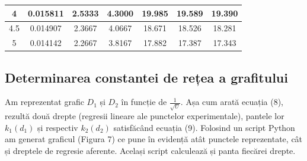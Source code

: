 \documentclass{article}
\begin{document}
\begin{table}[H]
\begin{tabular}{|c|c|c|c|c|c|c|}
    {\color[HTML]{000000} 4}     & {\color[HTML]{000000} 0.015811}                                                         & {\color[HTML]{000000} 2.5333}                                                   & {\color[HTML]{000000} 4.3000}                                                   & {\color[HTML]{000000} 19.985}                                                                   & {\color[HTML]{000000} 19.589}                                                                   & {\color[HTML]{000000} 19.390}                                                         \\ \hline
    {\color[HTML]{000000} 4.5}   & {\color[HTML]{000000} 0.014907}                                                         & {\color[HTML]{000000} 2.3667}                                                   & {\color[HTML]{000000} 4.0667}                                                   & {\color[HTML]{000000} 18.671}                                                                   & {\color[HTML]{000000} 18.526}                                                                   & {\color[HTML]{000000} 18.281}                                                         \\ \hline
    {\color[HTML]{000000} 5}     & {\color[HTML]{000000} 0.014142}                                                         & {\color[HTML]{000000} 2.2667}                                                   & {\color[HTML]{000000} 3.8167}                                                   & {\color[HTML]{000000} 17.882}                                                                   & {\color[HTML]{000000} 17.387}                                                                   & {\color[HTML]{000000} 17.343}                                                         \\ \hline
    \end{tabular}
    \end{table}

\subsection{Determinarea constantei de rețea a grafitului}

\makebox[1cm]{} Am reprezentat grafic ${D}{_1}$ și ${D}{_2}$ în funcție de $\frac{1}{\sqrt{U}}$.
Așa cum arată ecuația (8), rezultă două drepte (regresii lineare ale punctelor experimentale), pantele lor ${k}{_1}({d}{_1})$
și respectiv ${k}{_2}({d}{_2})$ satisfăcând ecuația (9). Folosind un script Python am generat graficul (Figura 7) ce pune în evidență atât punctele
reprezentate, cât și dreptele de regresie aferente. Același script calculează și panta fiecărei drepte.
\end{document}
